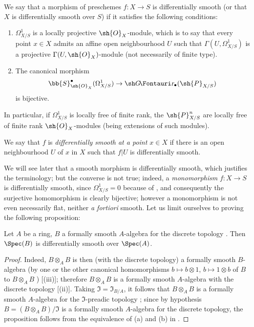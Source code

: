 \begin{definition}[16.10.1]
\label{IV.16.10.1}
We say that a morphism of preschemes $f: X \to S$ is differentially smooth (or that $X$ is differentially smooth over $S$) if it satisfies the following conditions:
\begin{enumerate}
  \item[\rm{(i)}] $\Omega_{X/S}^1$ is a locally projective $\sh{O}_X$-module, which is to say that every point $x \in X$ admits an affine open neighbourhood $U$ such that $\Gamma(U, \Omega_{X/S}^1)$ is a projective $\Gamma(U, \sh{O}_X)$-module (not necessarily of finite type).
  \item[\rm{(ii)}] The canonical morphism 
  \[
    \bb{S}_{\sh{O}_X}^\bullet(\Omega_{X/S}^1) \to \shGr_\bullet(\sh{P}_{X/S})
  \]
  is bijective.
\end{enumerate}

In particular, if $\Omega_{X/S}^1$ is locally free of finite rank, the $\sh{P}_{X/S}^n$ are locally free of finite rank $\sh{O}_X$-modules (being extensions of such modules).
\end{definition}

We say that $f$ is \emph{differentially smooth at a point $x \in X$} if there is an open neighbourhood $U$ of $x$ in $X$ such that $f|U$ is differentially smooth.

We will see later  that a smooth morphism is differentially smooth, which justifies the terminology;
but the converse is not true;
indeed, a \emph{monomorphism} $f:X \to S$ is differentially smooth, since $\Omega^1_{X/S} = 0$ because of , and consequently the surjective homomorphism  is clearly bijective;
however a monomorphism is not even necessarily flat, neither \textit{a fortiori} smooth. 
Let us limit ourselves to proving the following proposition:

\begin{proposition}[16.10.2]
\label{IV.16.10.2}
Let $A$ be a ring, $B$ a formally smooth $A$-algebra for the discrete topology .
Then $\Spec(B)$ is differentially smooth over $\Spec(A)$.
\end{proposition}

\begin{proof}
Indeed, $B \otimes_A B$ is then (with the discrete topology) a formally smooth $B$-algebra (by one or the other canonical homomorphisms $b \mapsto b \otimes 1$, $b \mapsto 1 \otimes b$ of $B$
to $B \otimes_A B$
) [(iii)];
therefore $B \otimes_A B$ is a formally smooth $A$-algebra with the discrete topology [(ii)].
Taking $\mathfrak{I} = \mathfrak{I}_{B/A}$, it follows that $B \otimes_A B$ is a formally smooth $A$-algebra for the $\mathfrak{I}$-preadic topology ;
since by hypothesis $B = (B \otimes_A B)/\mathfrak{I}$ is a formally smooth $A$-algebra for the discrete topology, the proposition follows from the equivalence of (a) and (b) in .
\end{proof}


